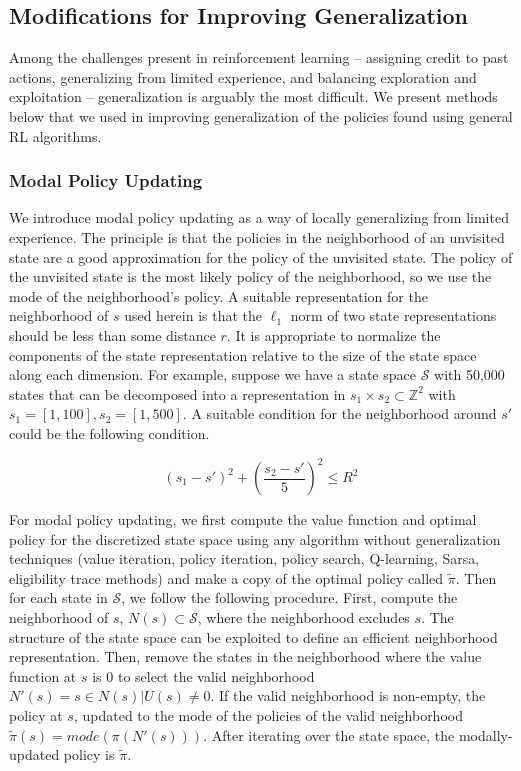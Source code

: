 \documentclass[10pt,letterpaper]{article}
\begin{document}
		\vspace*{0.05 in}
		
\begin{multicols*}{2}
					
	\subsection*{\sf \textbf{Modifications for Improving Generalization}}
	
	Among the challenges present in reinforcement learning -- assigning credit to past actions, generalizing from limited experience, and balancing exploration and exploitation -- generalization is arguably the most difficult. We present methods below that we used in improving generalization of the policies found using general RL algorithms.
		
	\subsubsection*{\sf \textbf{Modal Policy Updating}}
	
	We introduce modal policy updating as a way of locally generalizing from limited experience. The principle is that the policies in the neighborhood of an unvisited state are a good approximation for the policy of the unvisited state. The policy of the unvisited state is the most likely policy of the neighborhood, so we use the mode of the neighborhood's policy. A suitable representation for the neighborhood of $s$ used herein is that the $\ell_1$ norm of two state representations should be less than some distance $r$. It is appropriate to normalize the components of the state representation relative to the size of the state space along each dimension. For example, suppose we have a state space $\mathcal{S}$ with 50,000 states that can be decomposed into a representation in $s_1 \times s_2 \subset \mathbb{Z}^2 $ with $s_1 = [1,100], s_2 = [1, 500]$. A suitable condition for the neighborhood around $s'$ could be the following condition.
	 
	$$(s_1-s')^2 + \left(\frac{s_2-s'}{5}\right)^2 \leq R^2$$ 
	
	For modal policy updating, we first compute the value function and optimal policy for the discretized state space using any algorithm without generalization techniques (value iteration, policy iteration, policy search, Q-learning, Sarsa, eligibility trace methods) and make a copy of the optimal policy called $\tilde\pi$. Then for each state in $\mathcal{S}$, we follow the following procedure. First, compute the neighborhood of $s$, $N(s) \subset \mathcal{S}$, where the neighborhood excludes $s$. The structure of the state space can be exploited to define an efficient neighborhood representation. Then, remove the states in the neighborhood where the value function at $s$ is 0 to select the valid neighborhood $N'(s) = {s \in N(s) | U(s) \ne 0}$. If the valid neighborhood is non-empty, the policy at $s$, updated to the mode of the policies of the valid neighborhood $\tilde\pi(s) = mode(\pi(N'(s)))$. After iterating over the state space, the modally-updated policy is $\tilde\pi$.
	

\end{multicols*}
\end{document}
